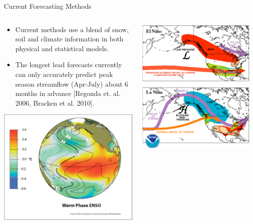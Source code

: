 \documentclass[final,x11names]{beamer}
\begin{document}
\begin{frame}{}
\begin{columns}
\begin{column}{.33\linewidth}
\begin{block}{\large Current Forecasting Methods}
\begin{columns} [T]
\begin{column}{.5\textwidth}
			    \begin{itemize}
			    \item Current methods use a blend of snow, soil and climate information 
			          in both physical and statistical models. 
			    \item {\color{orange}The longest lead forecasts currently can only accurately 
			          predict peak season streamflow (Apr-July) about 6 months in advance} 
			          [Regonda et. al. 2006, Bracken et al. 2010].  
			    \end{itemize}
			    
			    \begin{center}\includegraphics[width=.7\columnwidth]{figs/englobe}\end{center}
			  \end{column} 
			  \begin{column}{.45\textwidth} 
			    \includegraphics[width=.9\columnwidth]{figs/jetstream} 

\end{column}
\end{columns}
\end{block}
\end{column}
\end{columns}
\end{frame}
\end{document}
